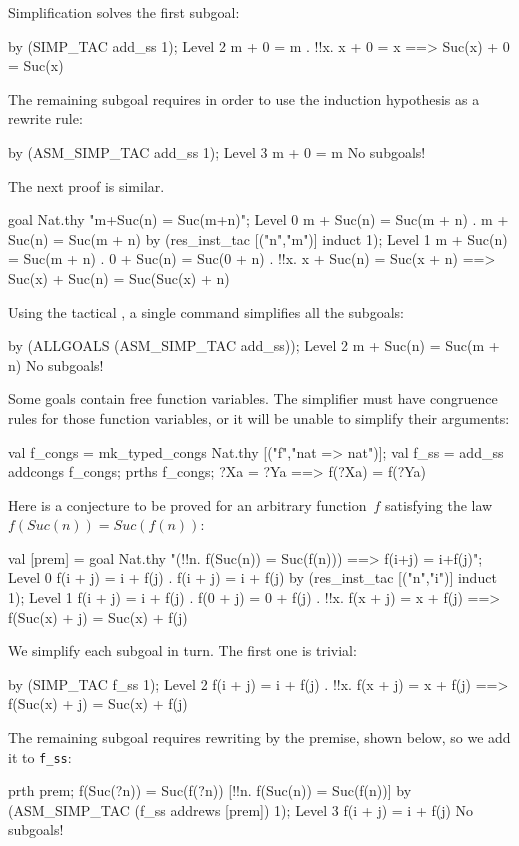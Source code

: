Simplification solves the first subgoal:
\begin{ttbox}
by (SIMP_TAC add_ss 1);
{\out Level 2}
{\out m + 0 = m}
{. !!x. x + 0 = x ==> Suc(x) + 0 = Suc(x)}
\end{ttbox}
The remaining subgoal requires  in order to use the
induction hypothesis as a rewrite rule:
\begin{ttbox}
by (ASM_SIMP_TAC add_ss 1);
{\out Level 3}
{\out m + 0 = m}
{\out No subgoals!}
\end{ttbox}
The next proof is similar.
\begin{ttbox}
goal Nat.thy "m+Suc(n) = Suc(m+n)";
{\out Level 0}
{\out m + Suc(n) = Suc(m + n)}
{. m + Suc(n) = Suc(m + n)}
\ttbreak
by (res_inst_tac [("n","m")] induct 1);
{\out Level 1}
{\out m + Suc(n) = Suc(m + n)}
{. 0 + Suc(n) = Suc(0 + n)}
{. !!x. x + Suc(n) = Suc(x + n) ==> Suc(x) + Suc(n) = Suc(Suc(x) + n)}
\end{ttbox}
Using the tactical , a single command simplifies all the
subgoals:
\begin{ttbox}
by (ALLGOALS (ASM_SIMP_TAC add_ss));
{\out Level 2}
{\out m + Suc(n) = Suc(m + n)}
{\out No subgoals!}
\end{ttbox}
Some goals contain free function variables.  The simplifier must have
congruence rules for those function variables, or it will be unable to
simplify their arguments:
\begin{ttbox}
val f_congs = mk_typed_congs Nat.thy [("f","nat => nat")];
val f_ss = add_ss addcongs f_congs;
prths f_congs;
{\out ?Xa = ?Ya ==> f(?Xa) = f(?Ya)}
\end{ttbox}
Here is a conjecture to be proved for an arbitrary function~$f$ satisfying
the law $f(Suc(n)) = Suc(f(n))$:
\begin{ttbox}
val [prem] = goal Nat.thy
    "(!!n. f(Suc(n)) = Suc(f(n))) ==> f(i+j) = i+f(j)";
{\out Level 0}
{\out f(i + j) = i + f(j)}
{. f(i + j) = i + f(j)}
\ttbreak
by (res_inst_tac [("n","i")] induct 1);
{\out Level 1}
{\out f(i + j) = i + f(j)}
{. f(0 + j) = 0 + f(j)}
{. !!x. f(x + j) = x + f(j) ==> f(Suc(x) + j) = Suc(x) + f(j)}
\end{ttbox}
We simplify each subgoal in turn.  The first one is trivial:
\begin{ttbox}
by (SIMP_TAC f_ss 1);
{\out Level 2}
{\out f(i + j) = i + f(j)}
{. !!x. f(x + j) = x + f(j) ==> f(Suc(x) + j) = Suc(x) + f(j)}
\end{ttbox}
The remaining subgoal requires rewriting by the premise, shown
below, so we add it to {\tt f_ss}:
\begin{ttbox}
prth prem;
{\out f(Suc(?n)) = Suc(f(?n))  [!!n. f(Suc(n)) = Suc(f(n))]}
by (ASM_SIMP_TAC (f_ss addrews [prem]) 1);
{\out Level 3}
{\out f(i + j) = i + f(j)}
{\out No subgoals!}
\end{ttbox}


